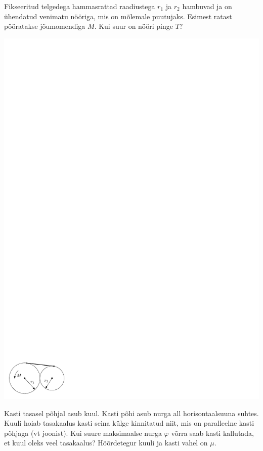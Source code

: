 \documentclass[10pt]{article}
\begin{document}
{\bigskip


Fikseeritud telgedega hammasrattad raadiustega $r_1$ ja $r_2$ hambuvad ja on
ühendatud venimatu nööriga,
mis on mõlemale puutujaks. Esimest ratast pööratakse
jõumomendiga $M$. Kui suur on nööri pinge $T$?

\begin{center}
	\includegraphics{2010-v3g-04-joonis_hr_ipe.pdf}
\end{center}
\probend
\bigskip


Kasti tasasel põhjal asub kuul. Kasti põhi asub nurga all horisontaalsuuna suhtes. Kuuli hoiab tasakaalus kasti seina külge kinnitatud niit, mis on paralleelne kasti põhjaga (vt joonist). Kui suure maksimaalse nurga $\varphi$ võrra saab kasti kallutada, et kuul oleks veel tasakaalus? Hõõrdetegur kuuli ja kasti vahel on $\mu$.

}
\end{document}
